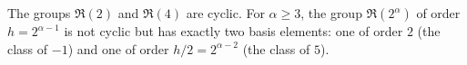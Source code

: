 The groups $\mathfrak{R}(2)$ and $\mathfrak{R}(4)$ are cyclic. For $\alpha \geq 3$, the group $\mathfrak{R}(2^\alpha)$ of order $h = 2^{\alpha-1}$ is not cyclic but has exactly two basis elements: one of order $2$ (the class of $-1$) and one of order $h/2 = 2^{\alpha-2}$ (the class of $5$).
